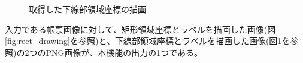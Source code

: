 \begin{figure}[t]
    \begin{center}
        \caption{取得した下線部領域座標の描画}
        \label{fig:underline_drawing}
    \end{center}
\end{figure}

入力である帳票画像に対して、矩形領域座標とラベルを描画した画像(図\ref{fig:rect_drawing}を参照)と、下線部領域座標とラベルを描画した画像(図\ref{fig:underline_drawing}を参照)の2つのPNG画像が、本機能の出力の1つである。